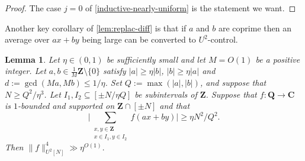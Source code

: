 \documentclass[11pt,reqno]{amsart}
\numberwithin{equation}{section}
\newtheorem{lemma}[theorem]{Lemma}
\theoremstyle{definition}
\theoremstyle{remark}
\newcommand{\snorm}[1]{\lVert#1\rVert}
\renewcommand{\le}{\leqslant}
\renewcommand{\ge}{\geqslant}
\newcommand\Z{\mathbf{Z}}
\newcommand\Q{\mathbf{Q}}
\newcommand\C{\mathbf{C}}
\begin{document}
\begin{proof}
The case $j = 0$ of \cref{inductive-nearly-uniform} is the statement we want.\end{proof}


Another key corollary of \cref{lem:replac-diff} is that if $a$ and $b$ are coprime then an average over $ax+by$ being large can be converted to $U^2$-control. 

\begin{lemma}\label{lem:U^2-control}
Let $\eta \in (0,1)$ be sufficiently small and let $M = O(1)$ be a positive integer. Let $a,b\in \frac{1}{M}\Z \setminus \{0\}$ satisfy $|a| \ge \eta |b|$, $|b| \ge \eta |a|$ and $d := \gcd(Ma,Mb) \le 1/\eta$. Set $Q := \max(|a|, |b|)$, and suppose that $N \ge Q^2/\eta^3$. Let $I_1, I_2 \subseteq[\pm N/\eta Q]$ be subintervals of $\Z$. Suppose that $f:\Q \to \C$ is $1$-bounded and supported on $\Z \cap [\pm N]$ and that 
\[\Big|\sum_{\substack{x,y\in \Z\\x\in I_1, y\in I_2}}f(ax + by)\Big|\ge \eta N^2/Q^2.\]
Then $\snorm{f}_{U^2[N]}^4\gg \eta^{O(1)}$.
\end{lemma}
\end{document}
